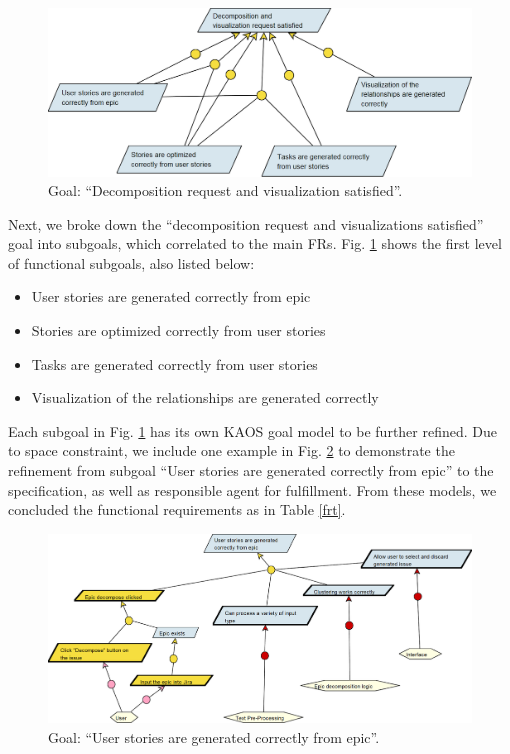 \begin{figure}
\centering
\includegraphics[width=\textwidth,keepaspectratio]{./figure/GoalsNFR2.png}
\caption{Goal: “Decomposition request and visualization satisfied”.}
\label{frgs}
\end{figure}

Next, we broke down the “decomposition request and visualizations satisfied” goal into subgoals, which correlated to the main FRs. Fig. \ref{frgs} shows the first level of functional subgoals, also listed below: 

\begin{itemize}
	\item User stories are generated correctly from epic
	\item Stories are optimized correctly from user stories
	\item Tasks are generated correctly from user stories
	\item Visualization of the relationships are generated correctly
\end{itemize}

Each subgoal in Fig. \ref{frgs} has its own KAOS goal model to be further refined. Due to space constraint, we include one example in Fig. \ref{fr1} to demonstrate the refinement from subgoal ``User stories are generated correctly from epic'' to the specification, as well as responsible agent for fulfillment.  From these models, we concluded the functional requirements as in Table \ref{frt}.

\begin{figure}
\centering
\includegraphics[width=\textwidth]{./figure/GoalsFR1.png}
\caption{Goal: “User stories are generated correctly from epic”.}
\label{fr1}
\end{figure}


